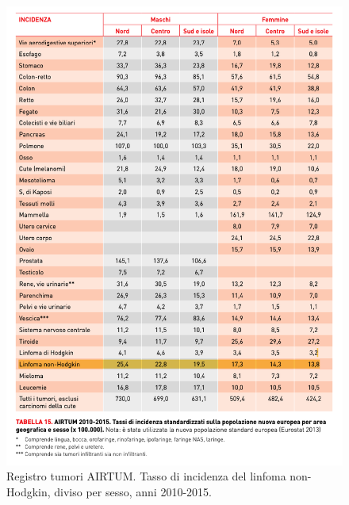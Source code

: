 \begin{figure}[H]
    \begin{center}
    \includegraphics[width=0.8\columnwidth]{img/INCIDENZA.png}
    \vspace{-3mm}
    \end{center}
    \caption{Registro tumori AIRTUM. Tasso di incidenza del linfoma non-Hodgkin, diviso per sesso, anni 2010-2015.
    \cite{img4-6-7}}

\end{figure}

